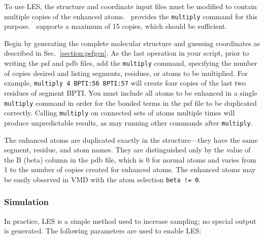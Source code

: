To use LES, the structure and coordinate input files must be modified to
contain multiple copies of the enhanced atoms.  \PSFGEN\ provides the
{\tt multiply} command for this purpose.  \NAMD\ supports a maximum of 15
copies, which should be sufficient.  

Begin by generating the complete molecular structure and guessing
coordinates as described in Sec.~\ref{section:psfgen}.  As the last
operation in your script, prior to writing the psf and pdb files, add
the {\tt multiply} command, specifying the number of copies desired and
listing segments, residues, or atoms to be multiplied.  For example,
\verb#multiply 4 BPTI:56 BPTI:57# will create four copies of the last
two residues of segment BPTI.  You must include all atoms to be
enhanced in a single {\tt multiply} command in order for the bonded
terms in the psf file to be duplicated correctly.  Calling {\tt multiply}
on connected sets of atoms multiple times will produce unpredictable
results, as may running other commands after {\tt multiply}.

The enhanced atoms are duplicated exactly in the structure---they have
the same segment, residue, and atom names.  They are distinguished only
by the value of the B (beta) column in the pdb file, which is 0 for
normal atoms and varies from 1 to the number of copies created for
enhanced atoms.  The enhanced atoms may be easily observed in VMD with
the atom selection \verb#beta != 0#.

\subsubsection{Simulation}

In practice, LES is a simple method used to increase sampling;
no special output is generated.
The following parameters are used to enable LES:

